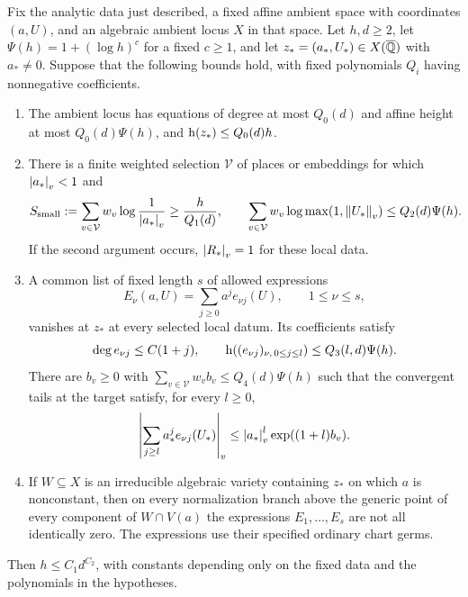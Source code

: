 \begin{theorem}\label{thm:interpolation}
Fix the analytic data just described, a fixed affine ambient space with
coordinates $(a,U)$, and an algebraic ambient locus $X$ in that space.
Let $h,d\geq2$, let $\Psi(h)=1+(\log h)^c$ for a fixed $c\geq1$, and
let $z_*=(a_*,U_*)\in X(\overline{\mathbb Q})$ with $a_*\ne0$.  Suppose that the
following bounds hold, with fixed polynomials $Q_i$ having nonnegative
coefficients.
\begin{enumerate}[label=\textup{(\roman*)}]
\item The ambient locus has equations of degree at most $Q_0(d)$ and
affine height at most $Q_0(d)\Psi(h)$, and
$\mathrm h\!\left(z_*\right)\leq Q_0(d)h$.
\item There is a finite weighted selection $\mathcal V$ of places or
embeddings for which $\left\lvert a_*\right\rvert_v<1$ and
\begin{equation}\label{eq:interpolation-smallness}
 S_{\rm small}:=\sum_{v\in\mathcal V}w_v
               \log\frac1{\left\lvert a_*\right\rvert_v}
 \geq\frac{h}{Q_1(d)},\qquad
 \sum_{v\in\mathcal V}w_v\log\max(1,\left\lVert U_*\right\rVert_v)
 \leq Q_2(d)\Psi(h).
\end{equation}
If the second argument occurs, $\left\lvert R_*\right\rvert_v=1$ for these local data.
\item A common list of fixed length $s$ of allowed expressions
\[
 E_\nu(a,U)=\sum_{j\geq0}a^j e_{\nu j}(U),\qquad 1\leq\nu\leq s,
\]
vanishes at $z_*$ at every selected local datum.  Its coefficients satisfy
\[
 \deg e_{\nu j}\leq C(1+j),\qquad
 \mathrm h\!\left((e_{\nu j})_{\nu,\,0\leq j\leq l}\right)
 \leq Q_3(l,d)\Psi(h).
\]
There are $b_v\geq0$ with
$\sum_{v\in\mathcal V}w_v b_v\leq Q_4(d)\Psi(h)$ such that the
convergent tails at the target satisfy, for every $l\geq0$,
\begin{equation}\label{eq:interpolation-tail}
 \left|\sum_{j\geq l}a_*^j e_{\nu j}(U_*)\right|_v
 \leq \left\lvert a_*\right\rvert_v^l\exp((1+l)b_v).
\end{equation}
\item If $W\subseteq X$ is an irreducible algebraic variety containing
$z_*$ on which $a$ is nonconstant, then on every normalization branch
above the generic point of every component of $W\cap V(a)$ the
expressions $E_1,\ldots,E_s$ are not all identically zero.  The
expressions use their specified ordinary chart germs.
\end{enumerate}
Then $h\leq C_1d^{C_2}$, with constants depending only on the fixed data
and the polynomials in the hypotheses.
\end{theorem}

